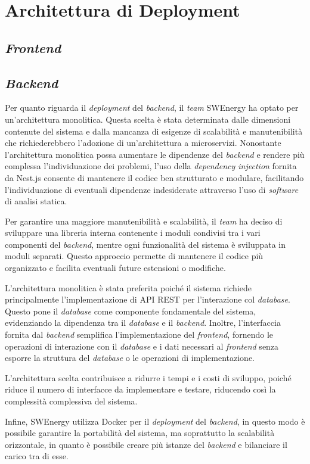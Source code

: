 \section{Architettura di Deployment}

\subsection{\textit{Frontend}}

\subsection{\textit{Backend}}

Per quanto riguarda il \textit{deployment} del \textit{backend}, il \textit{team}
SWEnergy ha optato per un'architettura monolitica. Questa scelta è stata
determinata dalle dimensioni contenute del sistema e dalla mancanza di esigenze
di scalabilità e manutenibilità che richiederebbero l'adozione di
un'architettura a microservizi. Nonostante l'architettura monolitica possa
aumentare le dipendenze del \textit{backend} e rendere più complessa
l'individuazione dei problemi, l'uso della \textit{dependency injection} fornita
da Nest.js consente di mantenere il codice ben strutturato e modulare,
facilitando l'individuazione di eventuali dipendenze indesiderate attraverso
l'uso di \textit{software} di analisi statica.

Per garantire una maggiore manutenibilità e scalabilità, il \textit{team} ha deciso di
sviluppare una libreria interna contenente i moduli condivisi tra i vari
componenti del \textit{backend}, mentre ogni funzionalità del sistema è
sviluppata in moduli separati. Questo approccio permette di mantenere il codice
più organizzato e facilita eventuali future estensioni o modifiche.

L'architettura monolitica è stata preferita poiché il sistema richiede
principalmente l'implementazione di API REST per l'interazione col \textit{database}.
Questo pone il \textit{database} come componente fondamentale del sistema, evidenziando
la dipendenza tra il \textit{database} e il \textit{backend}. Inoltre, l'interfaccia
fornita dal \textit{backend} semplifica l'implementazione del \textit{frontend},
fornendo le operazioni di interazione con il \textit{database} e i dati necessari al
\textit{frontend} senza esporre la struttura del \textit{database} o le operazioni di
implementazione.

L'architettura scelta contribuisce a ridurre i tempi e i costi di
sviluppo, poiché riduce il numero di interfacce da implementare e testare,
riducendo così la complessità complessiva del sistema.

Infine, SWEnergy utilizza Docker per il \textit{deployment} del
\textit{backend}, in questo modo è possibile garantire la portabilità del
sistema, ma soprattutto la scalabilità orizzontale, in quanto è possibile creare
più istanze del \textit{backend} e bilanciare il carico tra di esse.
